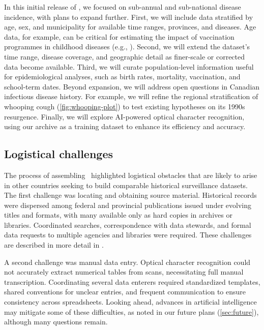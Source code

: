 \documentclass[12pt]{article}
\begin{document}
In this initial release of \datacronym, we focused on sub-annual and sub-national disease incidence, with plans to expand further. First, we will include data stratified by age, sex, and municipality for available time ranges, provinces, and diseases. Age data, for example, can be critical for estimating the impact of vaccination programmes in childhood diseases (e.g., \cite{wilkinson2022impact}). Second, we will extend the dataset's time range, disease coverage, and geographic detail as finer-scale or corrected data become available. Third, we will curate population-level information useful for epidemiological analyses, such as birth rates, mortality, vaccination, and school-term dates. Beyond expansion, we will address open questions in Canadian infectious disease history. For example, we will refine the regional stratification of whooping cough (\cref{fig:whooping-plot}) to test existing hypotheses \cite{thommes2020revisiting} on its 1990s resurgence. Finally, we will explore AI-powered optical character recognition, using our archive as a training dataset to enhance its efficiency and accuracy.

\subsection{Logistical challenges}\label{sec:logistics}

The process of assembling \datacronym\ highlighted logistical obstacles that are likely to arise in other countries seeking to build comparable historical surveillance datasets. The first challenge was locating and obtaining source material. Historical records were dispersed among federal and provincial publications issued under evolving titles and formats, with many available only as hard copies in archives or libraries. Coordinated searches, correspondence with data stewards, and formal data requests to multiple agencies and libraries were required. These challenges are described in more detail in .

A second challenge was manual data entry. Optical character recognition could not accurately extract numerical tables from scans, necessitating full manual transcription. Coordinating several data enterers required standardized templates, shared conventions for unclear entries, and frequent communication to ensure consistency across spreadsheets. Looking ahead, advances in artificial intelligence may mitigate some of these difficulties, as noted in our future plans (\cref{sec:future}), although many questions remain.
\end{document}
